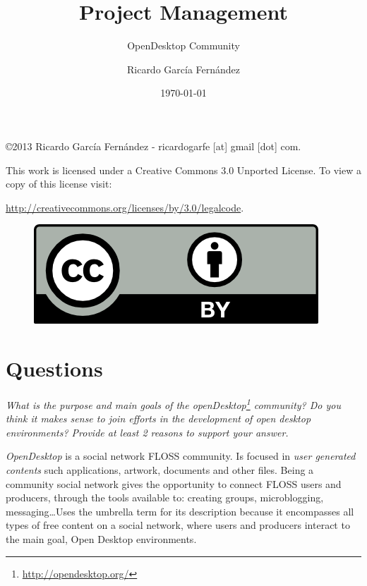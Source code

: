 \documentclass[11pt]{scrartcl}
\title{\textbf{Project Management}}
\subtitle{OpenDesktop Community}
\author{Ricardo Garc\'ia Fern\'andez}
\date{\today}
\begin{document}
\maketitle

\vfill

\begin{flushright}
    \copyright  2013 Ricardo Garc\'ia Fern\'andez - ricardogarfe [at] gmail [dot] com.

    This work is licensed under a Creative Commons 3.0 Unported License.
    To view a copy of this license visit:
 
    \url{http://creativecommons.org/licenses/by/3.0/legalcode}.
\end{flushright}

\begin{figure}[h]
    \begin{flushright}	
        \includegraphics{by}
        \label{fig:by}
    \end{flushright}
\end{figure}

\newpage

\section{Questions}

\emph{What is the purpose and main goals of the \emph{openDesktop}\footnote{\url{http://opendesktop.org/}} community? Do you think it makes sense to join efforts in the development of open desktop environments? Provide at least 2 reasons to support your answer.}

\par \emph{OpenDesktop} is a social network FLOSS community. Is focused in \emph{user generated contents} such applications, artwork, documents and other files. Being a community social network gives the opportunity to connect FLOSS users and producers, through the tools available to: creating groups, microblogging, messaging\ldots Uses the umbrella term for its description because it encompasses all types of free content on a social network, where users and producers interact to the main goal, Open Desktop environments.
\end{document}
